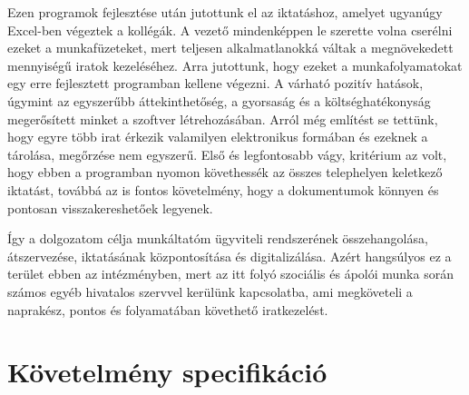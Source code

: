 \documentclass[
]{thesis-ekf}
\theoremstyle{definition}
\theoremstyle{remark}
\begin{document}
Ezen programok fejlesztése után jutottunk el az iktatáshoz, amelyet ugyanúgy Excel-ben végeztek a kollégák. A vezető mindenképpen le szerette volna cserélni ezeket a munkafüzeteket, mert teljesen alkalmatlanokká váltak a megnövekedett mennyiségű iratok kezeléséhez. Arra jutottunk, hogy ezeket a munkafolyamatokat egy erre fejlesztett programban kellene végezni. A várható pozitív hatások, úgymint az egyszerűbb áttekinthetőség, a gyorsaság és a költséghatékonyság megerősített minket a szoftver létrehozásában. Arról még említést se tettünk, hogy egyre több irat érkezik valamilyen elektronikus formában és ezeknek a tárolása, megőrzése nem egyszerű. Első és legfontosabb vágy, kritérium az volt, hogy ebben a programban nyomon követhessék az összes telephelyen keletkező iktatást, továbbá az is fontos követelmény, hogy a dokumentumok könnyen és pontosan visszakereshetőek legyenek.

Így a dolgozatom célja munkáltatóm ügyviteli rendszerének összehangolása, átszervezése, iktatásának központosítása és digitalizálása. Azért hangsúlyos ez a terület ebben az intézményben, mert az itt folyó szociális és ápolói munka során számos egyéb hivatalos szervvel kerülünk kapcsolatba, ami megköveteli a naprakész, pontos és folyamatában követhető iratkezelést.


\chapter{Követelmény specifikáció}
\end{document}
